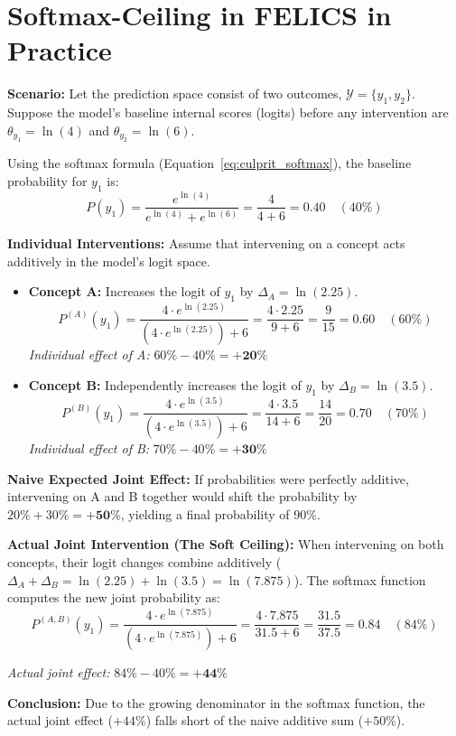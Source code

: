 \section*{Softmax-Ceiling in FELICS in Practice}
\begin{example_box}[label=ex:softmax_ceiling]
    \textbf{Scenario:} Let the prediction space consist of two outcomes, $\mathcal{Y} = \{y_1, y_2\}$. Suppose the model's baseline internal scores (logits) before any intervention are $\theta_{y_1} = \ln(4)$ and $\theta_{y_2} = \ln(6)$.

    Using the softmax formula (Equation~\ref{eq:culprit_softmax}), the baseline probability for $y_1$ is:
    \begin{equation} P(y_1) = \frac{e^{\ln(4)}}{e^{\ln(4)} + e^{\ln(6)}} = \frac{4}{4 + 6} = 0.40 \quad (40\%) \end{equation}

    \smallskip
    \textbf{Individual Interventions:}
    Assume that intervening on a concept acts additively in the model's logit space.
    \begin{itemize}
        \item \textbf{Concept A:} Increases the logit of $y_1$ by $\Delta_A = \ln(2.25)$.
              \begin{equation} P^{(A)}(y_1) = \frac{4 \cdot e^{\ln(2.25)}}{(4 \cdot e^{\ln(2.25)}) + 6} = \frac{4 \cdot 2.25}{9 + 6} = \frac{9}{15} = 0.60 \quad (60\%) \end{equation}
              \emph{Individual effect of A:} $60\% - 40\% = \mathbf{+20\%}$

        \item \textbf{Concept B:} Independently increases the logit of $y_1$ by $\Delta_B = \ln(3.5)$.
              \begin{equation} P^{(B)}(y_1) = \frac{4 \cdot e^{\ln(3.5)}}{(4 \cdot e^{\ln(3.5)}) + 6} = \frac{4 \cdot 3.5}{14 + 6} = \frac{14}{20} = 0.70 \quad (70\%) \end{equation}
              \emph{Individual effect of B:} $70\% - 40\% = \mathbf{+30\%}$
    \end{itemize}

    \smallskip
    \textbf{Naive Expected Joint Effect:} If probabilities were perfectly additive, intervening on A and B together would shift the probability by $20\% + 30\% = \mathbf{+50\%}$, yielding a final probability of $90\%$.

    \smallskip
    \textbf{Actual Joint Intervention (The Soft Ceiling):}
    When intervening on both concepts, their logit changes combine additively ($\Delta_A + \Delta_B = \ln(2.25) + \ln(3.5) = \ln(7.875)$). The softmax function computes the new joint probability as:
    \begin{equation} P^{(A,B)}(y_1) = \frac{4 \cdot e^{\ln(7.875)}}{(4 \cdot e^{\ln(7.875)}) + 6} = \frac{4 \cdot 7.875}{31.5 + 6} = \frac{31.5}{37.5} = 0.84 \quad (84\%) \end{equation}

    \smallskip
    \emph{Actual joint effect:} $84\% - 40\% = \mathbf{+44\%}$

    \smallskip
    \textbf{Conclusion:} Due to the growing denominator in the softmax function, the actual joint effect ($+44\%$) falls short of the naive additive sum ($+50\%$).
\end{example_box}
